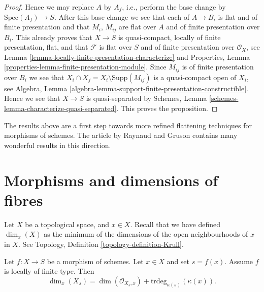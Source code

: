 \begin{proof}
\medskip\noindent
Hence we may replace $A$ by $A_f$, i.e.,
perform the base change by $\text{Spec}(A_f) \to S$.
After this base change we see that each of $A \to B_i$ is
flat and of finite presentation and that $M_i$, $M_{ij}$ are flat over $A$
and of finite presentation over $B_i$.
This already proves that $X \to S$ is quasi-compact,
locally of finite presentation, flat, and that $\mathcal{F}$
is flat over $S$ and of finite presentation over $\mathcal{O}_X$, see
Lemma \ref{lemma-locally-finite-presentation-characterize}
and
Properties, Lemma \ref{properties-lemma-finite-presentation-module}.
Since $M_{ij}$ is of finite presentation over $B_i$ we see that
$X_i \cap X_j = X_i \setminus \text{Supp}(M_{ij})$ is a quasi-compact
open of $X_i$, see
Algebra, Lemma \ref{algebra-lemma-support-finite-presentation-constructible}.
Hence we see that $X \to S$ is quasi-separated by
Schemes, Lemma \ref{schemes-lemma-characterize-quasi-separated}.
This proves the proposition.
\end{proof}









\begin{remark}
\label{remark-flattening}
The results above are a first step towards more refined flattening techniques
for morphisms of schemes. The article \cite{GruRay} by Raynaud and Gruson
contains many wonderful results in this direction.
\end{remark}







\section{Morphisms and dimensions of fibres}
\label{section-dimension-fibres}

\noindent
Let $X$ be a topological space, and $x \in X$.
Recall that we have defined $\dim_x(X)$ as the minimum of the
dimensions of the open neighbourhoods of $x$ in $X$.
See Topology, Definition \ref{topology-definition-Krull}.

\begin{lemma}
\label{lemma-dimension-fibre-at-a-point}
Let $f : X \to S$ be a morphism of schemes.
Let $x \in X$ and set $s = f(x)$.
Assume $f$ is locally of finite type.
Then
$$
\dim_x(X_s) =
\dim(\mathcal{O}_{X_s, x}) + \text{trdeg}_{\kappa(s)}(\kappa(x)).
$$
\end{lemma}

